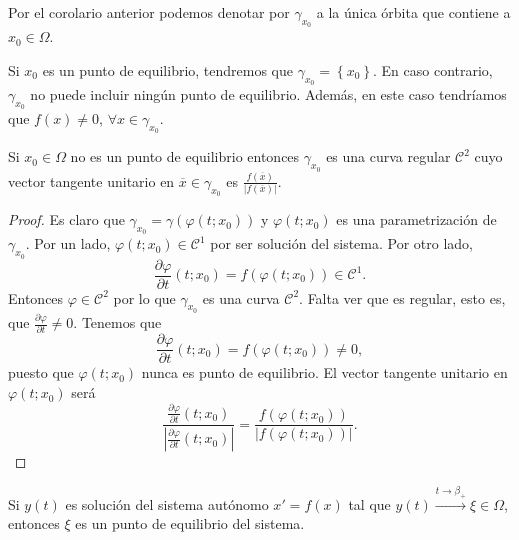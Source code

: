 \begin{notation}
Por el corolario anterior podemos denotar por $\displaystyle \gamma_{x_{0}} $ a la única órbita que contiene a $\displaystyle x_{0}\in \Omega  $. 
\end{notation}
\begin{observation}
	Si $\displaystyle x_{0} $ es un punto de equilibrio, tendremos que $\displaystyle \gamma_{x_{0}} = \left\{ x_{0}\right\}  $. En caso contrario, $\displaystyle \gamma_{x_{0}} $ no puede incluir ningún punto de equilibrio. Además, en este caso tendríamos que $\displaystyle f\left(x\right)\neq 0 $, $\displaystyle \forall x \in \gamma_{x_{0}} $. 
\end{observation}
\begin{prop}
Si $\displaystyle x_{0}\in \Omega  $ no es un punto de equilibrio entonces $\displaystyle \gamma_{x_{0}} $ es una curva regular $\displaystyle \mathcal{C}^{2} $ cuyo vector tangente unitario en $\displaystyle \overline{x}\in \gamma_{x_{0}} $ es $\displaystyle \frac{f\left(\overline{x}\right)}{ \left|f\left(\overline{x}\right)\right|} $. 
\end{prop}
\begin{proof}
Es claro que $\displaystyle \gamma_{x_{0}}=\gamma\left(\varphi\left(t; x_{0}\right)\right) $ y $\displaystyle \varphi\left(t; x_{0}\right) $ es una parametrización de $\displaystyle \gamma_{x_{0}} $. Por un lado, $\displaystyle \varphi\left(t; x_{0}\right)\in \mathcal{C}^{1} $ por ser solución del sistema. Por otro lado, 
\[\frac{\partial \varphi}{\partial t}\left(t; x_{0}\right)=f\left(\varphi\left(t; x_{0}\right)\right)\in \mathcal{C}^{1} .\]
Entonces $\displaystyle \varphi\in \mathcal{C}^{2} $ por lo que $\displaystyle \gamma_{x_{0}} $ es una curva $\displaystyle \mathcal{C}^{2} $. Falta ver que es regular, esto es, que $\displaystyle \frac{\partial \varphi}{\partial t}\neq 0 $. Tenemos que 
\[\frac{\partial \varphi}{\partial t}\left(t; x_{0}\right)=f\left(\varphi\left(t; x_{0}\right)\right) \neq 0 ,\]
puesto que $\displaystyle \varphi\left(t; x_{0}\right) $ nunca es punto de equilibrio. El vector tangente unitario en $\displaystyle \varphi\left(t; x_{0}\right) $ será
\[\frac{\frac{\partial \varphi}{\partial t}\left(t; x_{0}\right)}{ \left|\frac{\partial \varphi}{\partial t}\left(t; x_{0}\right)\right|}=\frac{f\left(\varphi\left(t; x_{0}\right)\right)}{ \left|f\left(\varphi\left(t; x_{0}\right)\right)\right|} .\]
\end{proof}
\begin{prop}
	Si $\displaystyle y\left(t\right) $ es solución del sistema autónomo $\displaystyle x' = f\left(x\right) $ tal que $\displaystyle y\left(t\right)\xrightarrow{t \to \beta_{+ }} \xi \in \Omega $, entonces $\displaystyle \xi $ es un punto de equilibrio del sistema. 
\end{prop}
